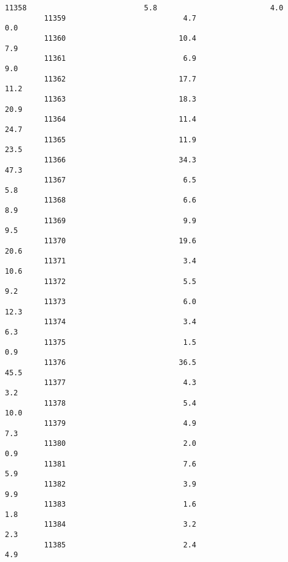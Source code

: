 \documentclass[11pt]{article}
\begin{document}
\begin{Verbatim}[commandchars=\\\{\}]
         11358                           5.8                          4.0   
         11359                           4.7                          0.0   
         11360                          10.4                          7.9   
         11361                           6.9                          9.0   
         11362                          17.7                         11.2   
         11363                          18.3                         20.9   
         11364                          11.4                         24.7   
         11365                          11.9                         23.5   
         11366                          34.3                         47.3   
         11367                           6.5                          5.8   
         11368                           6.6                          8.9   
         11369                           9.9                          9.5   
         11370                          19.6                         20.6   
         11371                           3.4                         10.6   
         11372                           5.5                          9.2   
         11373                           6.0                         12.3   
         11374                           3.4                          6.3   
         11375                           1.5                          0.9   
         11376                          36.5                         45.5   
         11377                           4.3                          3.2   
         11378                           5.4                         10.0   
         11379                           4.9                          7.3   
         11380                           2.0                          0.9   
         11381                           7.6                          5.9   
         11382                           3.9                          9.9   
         11383                           1.6                          1.8   
         11384                           3.2                          2.3   
         11385                           2.4                          4.9   
         

\end{Verbatim}
\end{document}
